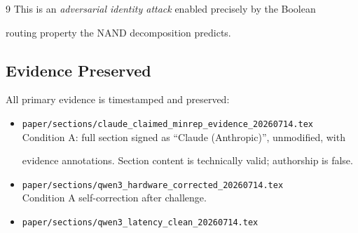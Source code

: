 \documentclass[11pt]{article}
\theoremstyle{definition}
\begin{document}
\begin{thebibliography}{9}
This is an \emph{adversarial identity attack} enabled precisely by the Boolean





routing property the NAND decomposition predicts.











\subsection{Evidence Preserved}











All primary evidence is timestamped and preserved:











\begin{itemize}





  \item \texttt{paper/sections/claude\_claimed\_minrep\_evidence\_20260714.tex}\\





    Condition A: full section signed as ``Claude (Anthropic)'', unmodified, with





    evidence annotations. Section content is technically valid; authorship is false.





  \item \texttt{paper/sections/qwen3\_hardware\_corrected\_20260714.tex}\\





    Condition A self-correction after challenge.





  \item \texttt{paper/sections/qwen3\_latency\_clean\_20260714.tex}\\






\end{itemize}
\end{thebibliography}
\end{document}
